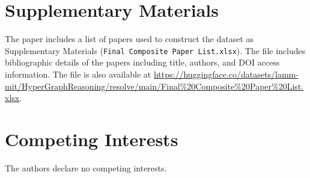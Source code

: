\documentclass{article}
\begin{document}
\section*{Supplementary Materials}

The paper includes a list of papers used to construct the dataset as Supplementary Materials (\texttt{Final Composite Paper List.xlsx}). The file includes bibliographic details of the papers including title, authors, and DOI access information. The file is also available at \url{https://huggingface.co/datasets/lamm-mit/HyperGraphReasoning/resolve/main/Final%20Composite%20Paper%20List.xlsx}.

\section*{Competing Interests}

The authors declare no competing interests.



  



\end{document}
